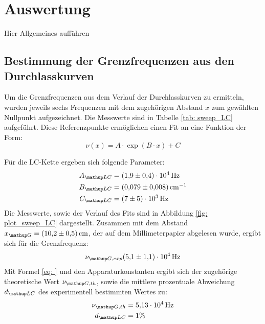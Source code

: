 \section{Auswertung}
Hier Allgemeines aufführen

\subsection{Bestimmung der Grenzfrequenzen aus den Durchlasskurven}
Um die Grenzfrequenzen aus dem Verlauf der Durchlasskurven zu ermitteln, wurden jeweils sechs
Frequenzen mit dem zugehörigen Abstand $x$ zum gewählten Nullpunkt aufgezeichnet. Die Messwerte
sind in Tabelle \ref{tab: sweep_LC} aufgeführt. Diese Referenzpunkte ermöglichen einen Fit an eine Funktion der Form:
\begin{equation}
  \nu(x) = A \cdot \exp(B\cdot x) + C
  \label{eq: exp_fit}
\end{equation}
\FloatBarrier

Für die LC-Kette ergeben sich folgende Parameter:
\begin{align}
  \begin{aligned}
    A\ua{LC} &= \SI{1.9(4)e4}{\hertz}\\
    B\ua{LC} &= \SI{0.079(8)}{\cm^{-1}}\\
    C\ua{LC} &= \SI{7(5)e3}{\hertz}
  \end{aligned}
  \label{eq: params_LC}
\end{align}
Die Messwerte, sowie der Verlauf des Fits sind in Abbildung \ref{fig: plot_sweep_LC} dargestellt. Zusammen
mit dem Abstand $x\ua{G} = \SI{10.2(5)}{cm}$, der auf dem Millimeterpapier abgelesen wurde, ergibt sich
für die Grenzfrequenz:
\begin{equation}
  \nu\ua{G, exp}\SI{5.1(11)e4}{\hertz}
  \label{eq: nu_g_LC}
\end{equation}
Mit Formel \eqref{eq: } und den Apparaturkonstanten ergibt sich der zugehörige theoretische Wert $\nu\ua{G, th}$, sowie die
mittlere prozentuale Abweichung $d\ua{LC}$ des experimentell bestimmten Wertes zu:
\begin{align}
  \nu\ua{G, th} &= \SI{5.13e4}{\hertz} \\
  d\ua{LC} &= 1 \%
\end{align}
\FloatBarrier
